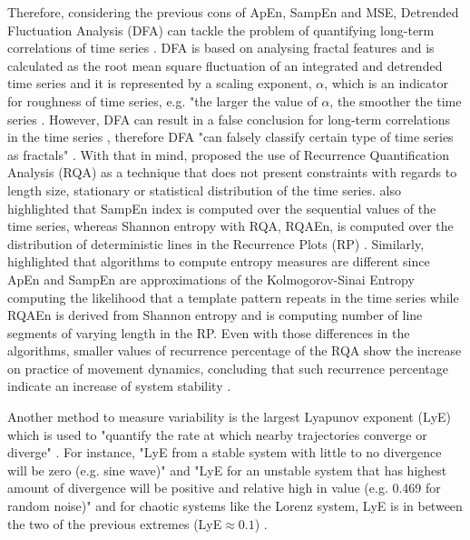 Therefore, considering the previous cons of ApEn, SampEn and MSE, Detrended 
Fluctuation Analysis (DFA) can tackle the problem of quantifying 
long-term correlations of time series \citep{peng1995}.
DFA is based on analysing fractal features and is calculated 
as the root mean square fluctuation of an integrated 
and detrended time series and it is represented by a scaling exponent, 
$\alpha$, which is an indicator for roughness of time series,
e.g. "the larger the value of $\alpha$, the smoother the time series 
\citep[p. 83]{peng1995}.
However, DFA can result in a false conclusion for long-term 
correlations in the time series \cite[p. 5001]{rangarajan2000}, therefore 
DFA "can falsely classify certain type of time series as fractals" 
\cite[p. 80]{wijnants2009}.
With that in mind, \cite{wijnants2009} proposed the use of 
Recurrence Quantification Analysis (RQA) as a 
technique that does not present constraints with 
regards to length size, stationary or statistical distribution 
of the time series.
\cite{wijnants2009} also highlighted that SampEn index is computed 
over the sequential values of the time series, whereas Shannon entropy with  
RQA, RQAEn, is computed over the distribution of deterministic lines in 
the Recurrence Plots (RP) \citep{marwan2008, trulla1996, zbilut1992}.
Similarly, \cite{rhea2011} highlighted that algorithms to compute entropy 
measures are different since ApEn and SampEn are approximations of the 
Kolmogorov-Sinai Entropy computing the likelihood that a template pattern 
repeats in the time series while RQAEn is derived from Shannon entropy 
and is computing number of line segments of varying length in the RP.
Even with those differences in the algorithms, smaller values of 
recurrence percentage of the RQA show the increase on practice of movement
dynamics, concluding that such recurrence percentage indicate an 
increase of system stability \citep{wijnants2009}.

Another method to measure variability is the largest Lyapunov exponent (LyE) 
which is used to "quantify the rate at which nearby trajectories
converge or diverge" \citep[p. 85]{stergiou2016b}.
For instance, "LyE from a stable system with little to no divergence will 
be zero (e.g. sine wave)" and "LyE for an unstable system that has highest 
amount of divergence will be positive and relative high in value
(e.g. 0.469 for random noise)" and for chaotic systems like the Lorenz system,
LyE is in between the two of the previous extremes (LyE$\approx0.1$) 
\cite[p. 2874]{miller2006}. 

